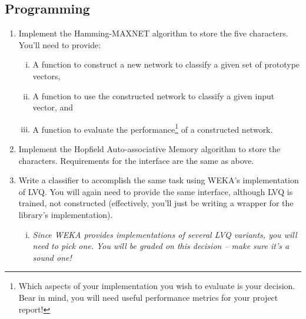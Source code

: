 \documentclass[11pt]{cselabheader}
\begin{document}
\subsection{Programming}
\begin{enumerate}
  \item Implement the Hamming-MAXNET algorithm to store the five characters. You'll need to provide:
  \begin{enumerate}[i.]
    \item A function to construct a new network to classify a given set of prototype vectors,
    \item A function to use the constructed network to classify a given input vector, and
    \item A function to evaluate the performance\footnote{Which aspects of your implementation you wish to evaluate is your decision. Bear in mind, you will need useful performance metrics for your project report!} of a constructed network.
  \end{enumerate}

  \item Implement the Hopfield Auto-associative Memory algorithm to store the characters. Requirements for the interface are the same as above.

  \item Write a classifier to accomplish the same task using WEKA's implementation of LVQ. You will again need to provide the same interface, although LVQ is trained, not constructed (effectively, you'll just be writing a wrapper for the library's implementation).
  \begin{enumerate}[i.]
    \item \textit{Since WEKA provides implementations of several LVQ variants, you will need to pick one. You will be graded on this decision -- make sure it's a sound one!}
  \end{enumerate}
\end{enumerate}
\end{document}
